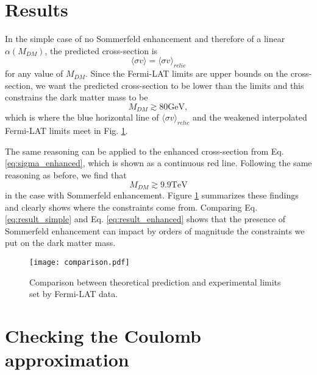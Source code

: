 \section{Results}\label{sec:results}
In the simple case of no Sommerfeld enhancement and therefore of a linear \(\alpha (M_{DM} )\), the predicted cross-section is
\begin{equation}
	\langle \sigma v \rangle = \langle \sigma v \rangle _{relic}
\end{equation}
for any value of \(M_{DM} \). Since the Fermi-LAT limits are upper bounds on the cross-section, we want the predicted cross-section to be lower than the limits and this constrains the dark matter mass to be
\begin{equation}\label{eq:result_simple}
	M_{DM} \gtrsim 80 \mathrm{GeV}, 
\end{equation}
which is where the blue horizontal line of \(\langle \sigma v \rangle _{relic} \) and the weakened interpolated Fermi-LAT limits meet in Fig. \ref{fig:comparison}.

The same reasoning can be applied to the enhanced cross-section from Eq. \ref{eq:sigma_enhanced}, which is shown as a continuous red line. Following the same reasoning as before, we find that
\begin{equation}\label{eq:result_enhanced}
	M_{DM} \gtrsim 9.9 \mathrm{TeV}
\end{equation}
in the case with Sommerfeld enhancement. Figure \ref{fig:comparison} summarizes these findings and clearly shows where the constraints come from. Comparing Eq. \ref{eq:result_simple} and Eq. \ref{eq:result_enhanced} shows that the presence of Sommerfeld enhancement can impact by orders of magnitude the constraints we put on the dark matter mass.

\begin{figure}[!ht]
	\centering
	\texttt{[image: comparison.pdf]}
	\caption{Comparison between theoretical prediction and experimental limits set by Fermi-LAT data.}
	\label{fig:comparison}
\end{figure}

\section{Checking the Coulomb approximation}

